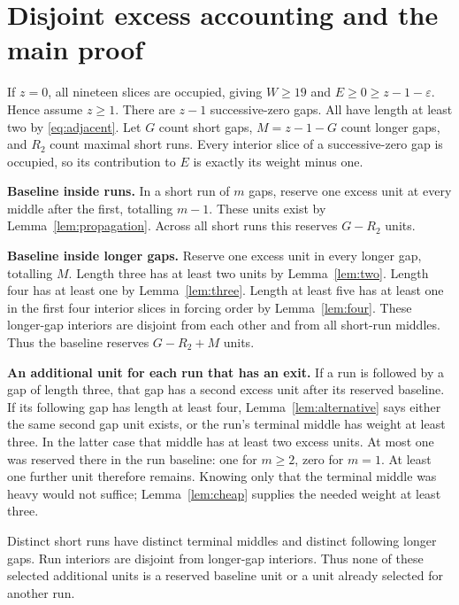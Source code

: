 \documentclass{article}
\begin{document}
\section{Disjoint excess accounting and the main proof}\label{sec:accounting}

If \(z = 0\), all nineteen slices are occupied, giving \(W \ge 19\) and
\(E \ge 0 \ge z - 1 - \varepsilon\). Hence assume \(z \ge 1\). There are \(z - 1\)
successive-zero gaps. All have length at least two by \eqref{eq:adjacent}. Let \(G\) count short
gaps, \(M = z - 1 - G\) count longer gaps, and \(R_2\) count maximal short runs. Every interior
slice of a successive-zero gap is occupied, so its contribution to \(E\) is exactly its weight
minus one.

\textbf{Baseline inside runs.} In a short run of \(m\) gaps, reserve one excess unit at every
middle after the first, totalling \(m - 1\). These units exist by Lemma~\ref{lem:propagation}.
Across all short runs this reserves \(G - R_2\) units.

\textbf{Baseline inside longer gaps.} Reserve one excess unit in every longer gap, totalling
\(M\). Length three has at least two units by Lemma~\ref{lem:two}. Length four has at least one
by Lemma~\ref{lem:three}. Length at least five has at least one in the first four interior slices
in forcing order by Lemma~\ref{lem:four}. These longer-gap interiors are disjoint from each other
and from all short-run middles. Thus the baseline reserves \(G - R_2 + M\) units.

\textbf{An additional unit for each run that has an exit.} If a run is followed by a gap of
length three, that gap has a second excess unit after its reserved baseline. If its following
gap has length at least four, Lemma~\ref{lem:alternative} says either the same second gap unit
exists, or the run's terminal middle has weight at least three. In the latter case that middle
has at least two excess units. At most one was reserved there in the run baseline: one for
\(m \ge 2\), zero for \(m = 1\). At least one further unit therefore remains. Knowing only that
the terminal middle was heavy would not suffice; Lemma~\ref{lem:cheap} supplies the needed weight
at least three.

Distinct short runs have distinct terminal middles and distinct following longer gaps. Run
interiors are disjoint from longer-gap interiors. Thus none of these selected additional units is
a reserved baseline unit or a unit already selected for another run.
\end{document}
